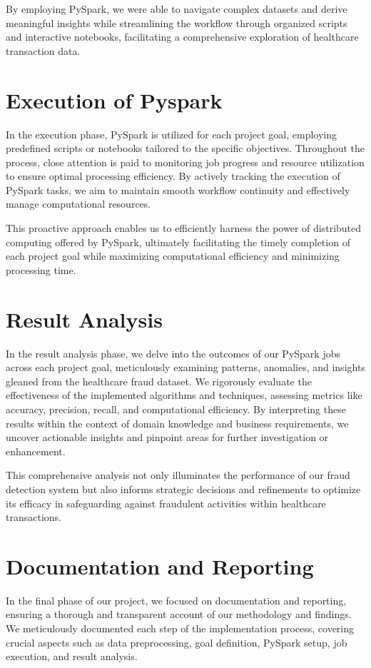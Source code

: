\documentclass{article}
\begin{document}
\hspace{0.5cm}By employing PySpark, we were able to navigate complex datasets and derive meaningful insights while streamlining the workflow through organized scripts and interactive notebooks, facilitating a comprehensive exploration of healthcare transaction data.
\section{Execution of Pyspark}
\hspace{1cm}In the execution phase, PySpark is utilized for each project goal, employing predefined scripts or notebooks tailored to the specific objectives. Throughout the process, close attention is paid to monitoring job progress and resource utilization to ensure optimal processing efficiency. By actively tracking the execution of PySpark tasks, we aim to maintain smooth workflow continuity and effectively manage computational resources. 

\hspace{0.5cm}This proactive approach enables us to efficiently harness the power of distributed computing offered by PySpark, ultimately facilitating the timely completion of each project goal while maximizing computational efficiency and minimizing processing time.
\section{Result Analysis}
  \hspace{1cm}In the result analysis phase, we delve into the outcomes of our PySpark jobs across each project goal, meticulously examining patterns, anomalies, and insights gleaned from the healthcare fraud dataset. We rigorously evaluate the effectiveness of the implemented algorithms and techniques, assessing metrics like accuracy, precision, recall, and computational efficiency. By interpreting these results within the context of domain knowledge and business requirements, we uncover actionable insights and pinpoint areas for further investigation or enhancement.
  
 \hspace{0.5cm}This comprehensive analysis not only illuminates the performance of our fraud detection system but also informs strategic decisions and refinements to optimize its efficacy in safeguarding against fraudulent activities within healthcare transactions.
  \section{Documentation and Reporting}
 \hspace{1cm}In the final phase of our project, we focused on documentation and reporting, ensuring a thorough and transparent account of our methodology and findings. We meticulously documented each step of the implementation process, covering crucial aspects such as data preprocessing, goal definition, PySpark setup, job execution, and result analysis.
\end{document}
